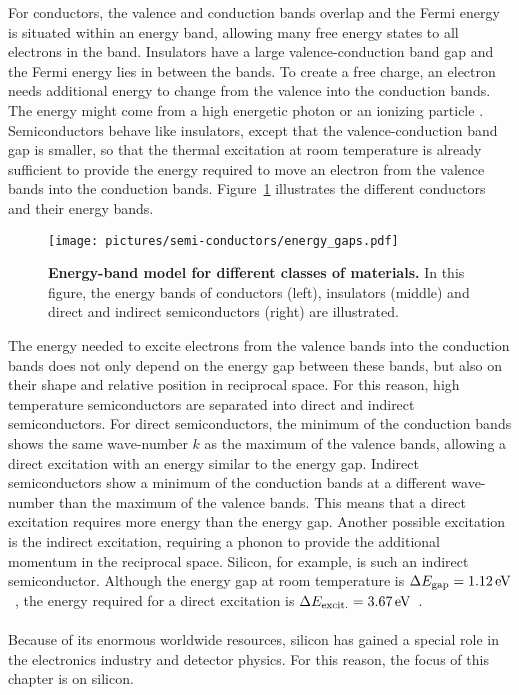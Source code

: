 For conductors, the valence and conduction bands overlap and the Fermi energy is situated within an energy band, allowing many free energy states to all electrons in the band. Insulators have a large valence-conduction band gap and the Fermi energy lies in between the bands. To create a free charge, an electron needs additional energy to change from the valence into the conduction bands. The energy might come from a high energetic photon or an ionizing particle%
. Semiconductors behave like insulators, except that the valence-conduction band gap is smaller, so that the thermal excitation at room temperature is already sufficient to provide the energy required to move an electron from the valence bands into the conduction bands. Figure~\ref{fig:energy_bands} illustrates the different conductors and their energy bands.
\begin{figure}
\begin{center}
\texttt{[image: pictures/semi-conductors/energy\_gaps.pdf]}
\end{center}
\caption[Energy-band model for different classes of materials]{\textbf{Energy-band model for different classes of materials.} In this figure, the energy bands of conductors (left), insulators (middle) and direct and indirect semiconductors (right) are illustrated. }\label{fig:energy_bands}
\end{figure}
The energy needed to excite electrons from the valence bands into the conduction bands does not only depend on the energy gap between these bands, but also on their shape and relative position in reciprocal space. For this reason, high temperature semiconductors are separated into direct and indirect semiconductors. For direct semiconductors, the minimum of the conduction bands shows the same wave-number $k$ as the maximum of the valence bands, allowing a direct excitation with an energy similar to the energy gap. Indirect semiconductors show a minimum of the conduction bands at a different wave-number than the maximum of the valence bands. This means that a direct excitation requires more energy than the energy gap. Another possible excitation is the indirect excitation, requiring a phonon to provide the additional momentum in the reciprocal space. Silicon, for example, is such an indirect semiconductor. Although the energy gap at room temperature is $\Delta E_{\rm{gap}}=1.12\,\rm{eV}$~\cite{Lut99}, the energy required for a direct excitation is $\Delta E_{\rm{excit.}}=3.67\,\rm{eV}$~\cite{Ber12}.
\\
\\Because of its enormous worldwide resources, silicon has gained a special role in the electronics industry and detector physics. For this reason, the focus of this chapter is on silicon.


